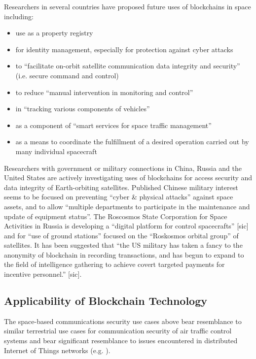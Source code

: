 \documentclass[journal ]{new-aiaa}
\begin{document}
Researchers in several countries have proposed future uses of blockchains in space including:
\begin{itemize}
\item use as a property registry\cite{beldavs_blockchains_2016}
\item for identity management, especially for protection against cyber attacks \cite{yu_blockchain_2019,xu_exploration_2019}
\item to  ``facilitate on-orbit satellite communication data integrity and security''\cite{molesky_blockchain_2018} (i.e. secure command and control)
\item to reduce ``manual intervention in monitoring and control''\cite{jennath_distributed_2019}
\item in ``tracking various components of vehicles''\cite{jennath_distributed_2019}
\item as a component of ``smart services for space traffic management''\cite{skobelev_towards_2018}
\item as a means to coordinate the fulfillment of a desired operation carried out by many individual spacecraft\cite{mandl_bitcoin_2017}
\end{itemize}

Researchers with government or military connections in China, Russia and the United States are actively investigating uses of blockchains for access security and data integrity of Earth-orbiting satellites. Published Chinese military interest seems to be focused on preventing ``cyber \& physical attacks'' against space assets\cite{yu_blockchain_2019}, and to allow ``multiple departments to participate in the maintenance and update of equipment status''\cite{yu_situational_2019}. The Roscosmos State Corporation for Space Activities in Russia is developing a ``digital platform for control spacecrafts'' [sic] and for ``use of ground stations'' focused on the ``Roskosmos orbital group'' of satellites\cite{skobelev_towards_2018}. It has been suggested that ``the US military has taken a fancy to the anonymity of blockchain in recording transactions, and has begun to expand to the field of intelligence gathering to achieve covert targeted payments for incentive personnel.'' [sic]\cite{yu_situational_2019}.

\subsection{Applicability of Blockchain Technology}

The space-based communications security use cases above bear resemblance to similar terrestrial use cases for communication security of air traffic control systems\cite{reisman_air_2019} and bear significant resemblance to issues encountered in distributed Internet of Things networks (e.g. \cite{dorri2017lsb, dorri2019mof}).
\end{document}
